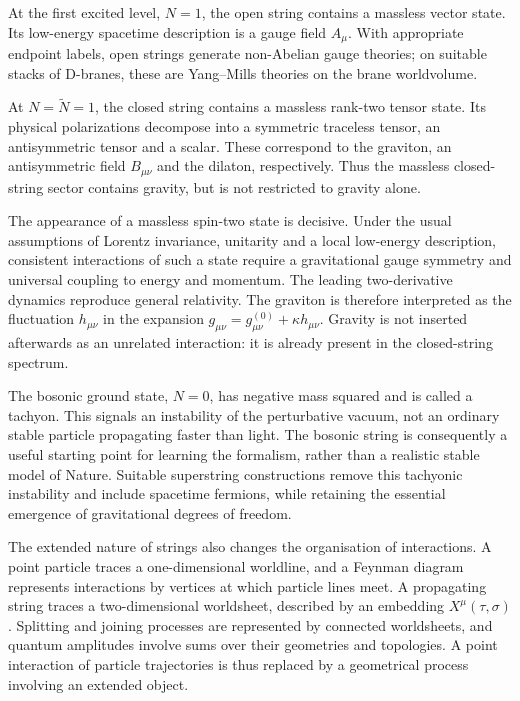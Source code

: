 At the first excited level, $N = 1$, the open string contains a massless vector state. Its low-energy spacetime description is a gauge field $A_\mu$. With appropriate endpoint labels, open strings generate non-Abelian gauge theories; on suitable stacks of D-branes, these are Yang--Mills theories on the brane worldvolume.

At $N = \widetilde N=1$, the closed string contains a massless rank-two tensor state. Its physical polarizations decompose into a symmetric traceless tensor, an antisymmetric tensor and a scalar. These correspond to the graviton, an antisymmetric field $B_{\mu\nu}$ and the dilaton, respectively. Thus the massless closed-string sector contains gravity, but is not restricted to gravity alone.

The appearance of a massless spin-two state is decisive. Under the usual assumptions of Lorentz invariance, unitarity and a local low-energy description, consistent interactions of such a state require a gravitational gauge symmetry and universal coupling to energy and momentum. The leading two-derivative dynamics reproduce general relativity. The graviton is therefore interpreted as the fluctuation $h_{\mu\nu}$ in the expansion $g_{\mu\nu}=g^{(0)}_{\mu\nu}+\kappa h_{\mu\nu}$. Gravity is not inserted afterwards as an unrelated interaction: it is already present in the closed-string spectrum.

The bosonic ground state, $N=0$, has negative mass squared and is called a tachyon. This signals an instability of the perturbative vacuum, not an ordinary stable particle propagating faster than light. The bosonic string is consequently a useful starting point for learning the formalism, rather than a realistic stable model of Nature. Suitable superstring constructions remove this tachyonic instability and include spacetime fermions, while retaining the essential emergence of gravitational degrees of freedom.

The extended nature of strings also changes the organisation of interactions. A point particle traces a one-dimensional worldline, and a Feynman diagram represents interactions by vertices at which particle lines meet. A propagating string traces a two-dimensional worldsheet, described by an embedding $X^\mu(\tau,\sigma)$. Splitting and joining processes are represented by connected worldsheets, and quantum amplitudes involve sums over their geometries and topologies. A point interaction of particle trajectories is thus replaced by a geometrical process involving an extended object.

